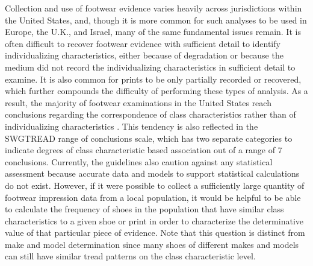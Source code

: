 \documentclass{article}\usepackage[]{graphicx}\usepackage[table]{xcolor}
\begin{document}
Collection and use of footwear evidence varies heavily across jurisdictions within the United States, and, though it is more common for such analyses to be used in Europe, the U.K., and Israel, many of the same fundamental issues remain. It is often difficult to recover footwear evidence with sufficient detail to identify individualizing characteristics, either because of degradation or because the medium did not record the individualizing characteristics in sufficient detail to examine. It is also common for prints to be only partially recorded or recovered, which further compounds the difficulty of performing these types of analysis. As a result, the majority of footwear examinations in the United States reach conclusions regarding the correspondence of class characteristics rather than of individualizing characteristics \citep{smith_2011}. This tendency is also reflected in the SWGTREAD range of conclusions scale, which has two separate categories to indicate degrees of class characteristic based association out of a range of 7 conclusions\citep{SWGTREAD2013}. Currently, the guidelines also caution against any statistical assessment because accurate data and models to support statistical calculations do not exist. However, if it were possible to collect a sufficiently large quantity of footwear impression data from a local population, it would be helpful to be able to calculate the frequency of shoes in the population that have similar class characteristics to a given shoe or print in order to characterize the determinative value of that particular piece of evidence. Note that this question is distinct from make and model determination since many shoes of different makes and models can still have similar tread patterns on the class characteristic level.
\end{document}
